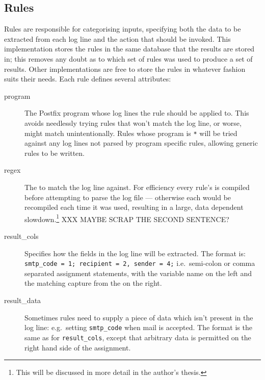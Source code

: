 \documentclass[draft]{svmult}
\newcommand{\tab}[0]{%
    \hspace*{2em}%
}
\begin{document}
\subsection{Rules}

\label{Rules}

Rules are responsible for categorising inputs, specifying both the data to
be extracted from each log line and the action that should be invoked.
This implementation stores the rules in the same \SQL{} database that the
results are stored in; this removes any doubt as to which set of rules was
used to produce a set of results.  Other implementations are free to store
the rules in whatever fashion suits their needs.  Each rule defines several
attributes:

\begin{description}

    \item [program] The Postfix program whose log lines the rule should be
        applied to.  This avoids needlessly trying rules that won't match
        the log line, or worse, might match unintentionally.  Rules whose
        program is \texttt{*} will be tried against any log lines not
        parsed by program specific rules, allowing generic rules to be
        written.

    \item [regex] The \regex{} to match the log line against.  For
        efficiency every rule's \regex{} is compiled before attempting to
        parse the log file --- otherwise each \regex{} would be recompiled
        each time it was used, resulting in a large, data dependent
        slowdown.\footnote{This will be discussed in more detail in the
        author's thesis.}  XXX MAYBE SCRAP THE SECOND SENTENCE\@?

    \item [result\_cols] Specifies how the fields in the
        log line will be extracted.  The format is:
        \tab{} \texttt{smtp\_code = 1; recipient = 2, sender = 4;}
        \newline i.e.\ semi-colon or comma separated assignment statements,
        with the variable name on the left and the matching capture from
        the \regex{} on the right.

    \item [result\_data] Sometimes rules need to supply a piece of data
        which isn't present in the log line: e.g.\ setting
        \texttt{smtp\_code} when mail is accepted.  The format is the same
        as for \texttt{result\_cols}, except that arbitrary data is
        permitted on the right hand side of the assignment.


\end{description}
\end{document}
